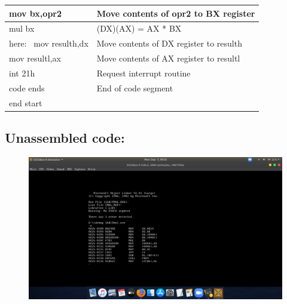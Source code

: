 \documentclass[12pt,a4paper]{article}
\begin{document}
\begin{flushleft}
\begin{table}[htb]
{\begin{tabular}{|l|l|}
\hline
mov bx,opr2                                                      & Move contents of opr2 to BX register          \\ 
\hline
mul bx                                                           & (DX)(AX) = AX * BX                            \\ 
\hline
here:~ mov resulth,dx                                            & Move contents of DX register to resulth       \\ 
\hline
mov resultl,ax                                                   & Move contents of AX register to resultl       \\ 
\hline
int 21h                                                          & Request interrupt routine                     \\ 
\hline
code ends                                                        & End of code segment                           \\
\hline
end start                                                        &                                               \\
\hline
\end{tabular}
}
\end{table}

\newpage
\subsection*{\textbf{Unassembled code:}}
\begin{figure}[h]
    \centering
    \includegraphics[trim = 100mm 60mm 150mm 127mm, clip, width = \textwidth]{Pics/MultiplicationUS.png}
\end{figure}

\end{flushleft}
\end{document}
